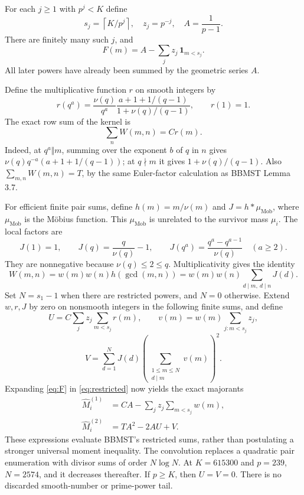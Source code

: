 \documentclass[11pt]{article}
\begin{document}
For each $j\geq1$ with $p^j<K$ define
\[
 s_j=\left\lceil K/p^j\right\rceil,
 \quad z_j=p^{-j},\quad A=\frac1{p-1}.
\]
There are finitely many such $j$, and
\begin{equation}\label{eq:F}
 F(m)=A-\sum_j z_j\,\mathbf1_{m<s_j}.
\end{equation}
All later powers have already been summed by the geometric series $A$.

Define the multiplicative function $r$ on smooth integers by
\begin{equation}\label{eq:r}
 r(q^a)=\frac{\nu(q)}{q^a}
       \frac{a+1+1/(q-1)}{1+\nu(q)/(q-1)},\qquad r(1)=1.
\end{equation}
The exact row sum of the kernel is
\begin{equation}\label{eq:row}
 \sum_n W(m,n)=C r(m).
\end{equation}
Indeed, at $q^a\Vert m$, summing over the exponent $b$ of $q$ in $n$ gives
$\nu(q)q^{-a}(a+1+1/(q-1))$; at $q\nmid m$ it gives
$1+\nu(q)/(q-1)$. Also $\sum_{m,n}W(m,n)=T$, by the same Euler-factor
calculation as BBMST Lemma 3.7.

For efficient finite pair sums, define $h(m)=m/\nu(m)$ and
$J=h*\mu_{\mathrm{Mob}}$, where $\mu_{\mathrm{Mob}}$ is the M\"obius function.
This $\mu_{\mathrm{Mob}}$ is unrelated to the survivor mass $\mu_i$.
The local factors are
\begin{equation}\label{eq:J}
 J(1)=1,\qquad J(q)=\frac q{\nu(q)}-1,\qquad
 J(q^a)=\frac{q^a-q^{a-1}}{\nu(q)}\quad(a\geq2).
\end{equation}
They are nonnegative because $\nu(q)\leq2\leq q$.
Multiplicativity gives the identity
\[
 W(m,n)=w(m)w(n)h(\gcd(m,n))
       =w(m)w(n)\sum_{d\mid m,\ d\mid n}J(d).
\]
Set $N=s_1-1$ when there are restricted powers, and $N=0$ otherwise. Extend
$w,r,J$ by zero on nonsmooth integers in the following finite sums, and define
\[
 U=C\sum_jz_j\sum_{m<s_j}r(m),\qquad
 v(m)=w(m)\sum_{j:m<s_j}z_j,
\]
\[
 V=\sum_{d=1}^{N}J(d)
          \left(\sum_{\substack{1\leq m\leq N\\d\mid m}}v(m)\right)^2.
\]
Expanding \eqref{eq:F} in \eqref{eq:restricted} now yields the exact majorants
\begin{align}
 \widehat M_i^{(1)}&=CA-\sum_jz_j\sum_{m<s_j}w(m),\label{eq:m1}\\
 \widehat M_i^{(2)}&=TA^2-2AU+V.\label{eq:m2}
\end{align}
These expressions evaluate BBMST's restricted sums, rather than postulating
a stronger universal moment inequality. The convolution replaces a quadratic
pair enumeration with divisor sums of order $N\log N$. At $K=615300$ and
$p=239$, $N=2574$, and it decreases thereafter. If $p\geq K$, then $U=V=0$.
There is no discarded smooth-number or prime-power tail.
\end{document}
